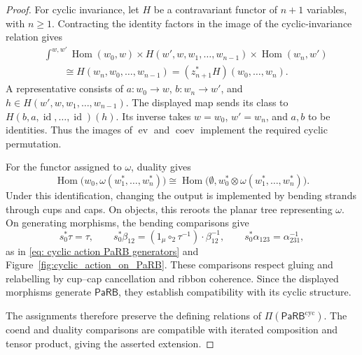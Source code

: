 \documentclass[10pt,a4paper]{amsart}
\newcommand{\Hom}{\operatorname{Hom}}
\newcommand{\PaRB}{\mathsf{PaRB}}
\newcommand{\coev}{\operatorname{coev}}
\newcommand{\ev}{\operatorname{ev}}
\newcommand{\id}{\operatorname{id}}
\newcommand{\twist}{\tau}
\begin{document}
\begin{proof}
For cyclic invariance, let $H$ be a contravariant functor of
$n+1$ variables, with $n\geq1$. Contracting the identity
factors in the image of the cyclic-invariance relation gives
\[
\begin{aligned}
&\int^{w,w'}
\Hom(w_0,w)\times
H(w',w,w_1,\ldots,w_{n-1})\times
\Hom(w_n,w')\\
&\qquad\cong
H(w_n,w_0,\ldots,w_{n-1})
=(z_{n+1}^*H)(w_0,\ldots,w_n).
\end{aligned}
\]
A representative consists of $a\colon w_0\to w$,
$b\colon w_n\to w'$, and
$h\in H(w',w,w_1,\ldots,w_{n-1})$.
The displayed map sends its class to
$H(b,a,\id,\ldots,\id)(h)$.
Its inverse takes $w=w_0$, $w'=w_n$, and $a,b$ to be
identities. Thus the images of $\ev$ and $\coev$ implement
the required cyclic permutation.

For the functor assigned to $\omega$, duality gives
\[
\Hom\bigl(w_0,\omega(w_1^*,\ldots,w_n^*)\bigr)
\cong
\Hom\bigl(
\emptyset,w_0^*\otimes\omega(w_1^*,\ldots,w_n^*)
\bigr).
\]
Under this identification, changing the output is implemented
by bending strands through cups and caps. On objects, this
reroots the planar tree representing $\omega$. On generating
morphisms, the bending comparisons give
\[
s_0^*\twist=\twist,\qquad
s_0^*\beta_{12}
=(1_\mu\circ_2\twist^{-1})\cdot\beta_{12}^{-1},
\qquad
s_0^*\alpha_{123}=\alpha_{231}^{-1},
\]
as in \eqref{eq: cyclic action PaRB generators} and
Figure~\ref{fig:cyclic_action_on_PaRB}.
These comparisons respect gluing and relabelling by cup--cap
cancellation and ribbon coherence. Since the displayed morphisms
generate $\PaRB$, they establish compatibility with its cyclic
structure.

The assignments therefore preserve the defining relations of
$\Pi(\PaRB^{\mathrm{cyc}})$. The coend and duality comparisons
are compatible with iterated composition and tensor product,
giving the asserted extension.
\end{proof}
\end{document}

